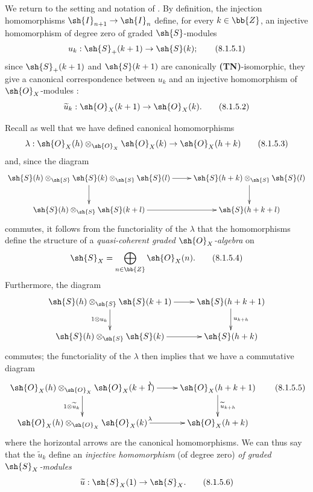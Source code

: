 \begin{env}[8.1.5]
\label{II.8.1.5}
We return to the setting and notation of .
By definition, the injection homomorphisms $\sh{I}_{n+1}\to\sh{I}_n$  define, for every $k\in\bb{Z}$, an injective homomorphism of degree zero of graded $\sh{S}$-modules
\[
\label{II.8.1.5.1}
  u_k: \sh{S}_+(k+1) \to \sh{S}(k);
\tag{8.1.5.1}
\]
since $\sh{S}_+(k+1)$ and $\sh{S}(k+1)$ are canonically \textbf{(TN)}-isomorphic, they give a canonical correspondence between $u_k$ and an injective homomorphism of $\sh{O}_X$-modules :
\[
\label{II.8.1.5.2}
  \widetilde{u}_k: \sh{O}_X(k+1) \to \sh{O}_X(k).
\tag{8.1.5.2}
\]

Recall as well  that we have defined canonical homomorphisms
\[
\label{II.8.1.5.3}
  \lambda: \sh{O}_X(h) \otimes_{\sh{O}_X} \sh{O}_X(k) \to \sh{O}_X(h+k)
\tag{8.1.5.3}
\]
and, since the diagram
\[
  \xymatrix{
    \sh{S}(h) \otimes_{\sh{S}} \sh{S}(k) \otimes_{\sh{S}} \sh{S}(l)
      \ar[r]
      \ar[d]
  & \sh{S}(h+k) \otimes_{\sh{S}} \sh{S}(l)
      \ar[d]
  \\\sh{S}(h) \otimes_{\sh{S}} \sh{S}(k+l)
      \ar[r]
  & \sh{S}(h+k+l)
  }
\]
commutes, it follows from the functoriality of the $\lambda$  that the homomorphisms  define the structure of a \emph{quasi-coherent graded $\sh{O}_X$-algebra} on
\[
\label{II.8.1.5.4}
  \sh{S}_X = \bigoplus_{n\in\bb{Z}}\sh{O}_X(n).
\tag{8.1.5.4}
\]
Furthermore, the diagram
\[
  \xymatrix{
    \sh{S}(h) \otimes_{\sh{S}} \sh{S}(k+1)
      \ar[r]
      \ar[d]_{1\otimes u_k}
  & \sh{S}(h+k+1)
      \ar[d]^{u_{k+h}}
  \\\sh{S}(h) \otimes_{\sh{S}} \sh{S}(k)
      \ar[r]
  & \sh{S}(h+k)
  }
\]
commutes; the functoriality of the $\lambda$ then implies that we have a commutative diagram
\[
\label{II.8.1.5.5}
  \xymatrix{
    \sh{O}_X(h) \otimes_{\sh{O}_X} \sh{O}_X(k+1)
      \ar[r]^{\lambda}
      \ar[d]_{1\otimes \widetilde{u}_k}
  & \sh{O}_X(h+k+1)
      \ar[d]^{\widetilde{u}_{k+h}}
  \\\sh{O}_X(h) \otimes_{\sh{O}_X} \sh{O}_X(k)
      \ar[r]^{\lambda}
  & \sh{O}_X(h+k)
  }
\tag{8.1.5.5}
\]
where the horizontal arrows are the canonical homomorphisms.
We can thus say that the $\widetilde{u}_k$ define an \emph{injective homomorphism} (of degree zero) \emph{of graded $\sh{S}_X$-modules}
\[
\label{II.8.1.5.6}
  \widetilde{u}: \sh{S}_X(1) \to \sh{S}_X.
\tag{8.1.5.6}
\]
\end{env}

